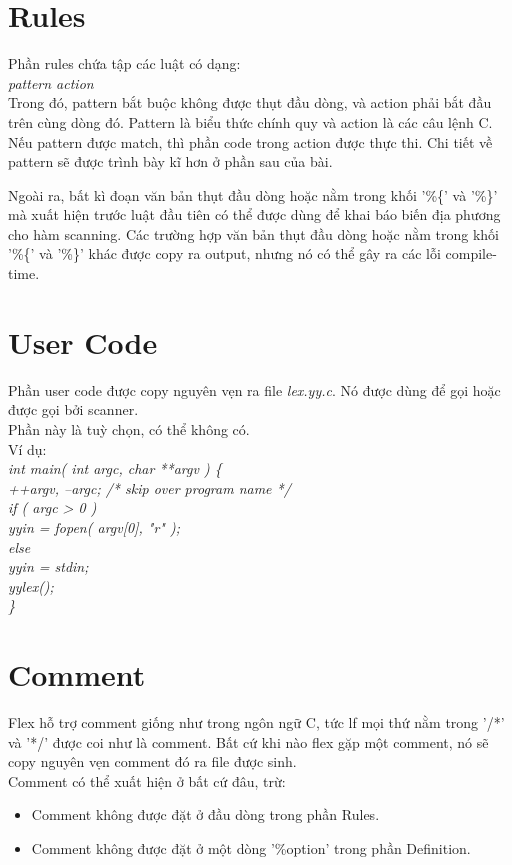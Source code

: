 \documentclass[14pt,a4paper]{extreport}
\begin{document}
\section{Rules}
Phần rules chứa tập các luật có dạng: \\
\hspace*{2cm}  \textit{pattern  action}\\
Trong đó, pattern bắt buộc không được thụt đầu dòng, và action phải bắt đầu trên cùng dòng đó. Pattern là biểu thức chính quy và action là các câu lệnh C. Nếu pattern được match, thì phần code trong action được thực thi. Chi tiết về pattern sẽ được trình bày kĩ hơn ở phần sau của bài.

Ngoài ra, bất kì đoạn văn bản thụt đầu dòng hoặc nằm trong khối '\%\{' và '\%\}' mà xuất hiện trước luật đầu tiên có thể được dùng để khai báo biến địa phương cho hàm scanning. Các trường hợp văn bản thụt đầu dòng hoặc nằm trong khối '\%\{' và '\%\}' khác được copy ra output, nhưng nó có thể gây ra các lỗi compile-time.

\section{User Code}
Phần user code được copy nguyên vẹn ra file \textit{lex.yy.c}. Nó được dùng để gọi hoặc được gọi bởi scanner. \\
Phần này là tuỳ chọn, có thể không có.\\
Ví dụ:\\
\textit{    int main( int argc, char **argv )
\{\\
\hspace*{2cm}	++argv, --argc;  /* skip over program name */ \\
\hspace*{2cm}	if ( argc > 0 )\\
\hspace*{3cm}	yyin = fopen( argv[0], "r" );\\
\hspace*{2cm}	else\\
\hspace*{3cm}	yyin = stdin;\\
\hspace*{2cm}	yylex();\\
\}\\}




\section{Comment}
Flex hỗ trợ comment giống như trong ngôn ngữ C, tức lf mọi thứ nằm trong '/*' và '*/' được coi như là comment. Bất cứ khi nào flex gặp một comment, nó sẽ copy nguyên vẹn comment đó ra file được sinh. \\
Comment có thể xuất hiện ở bất cứ đâu, trừ:
\begin{itemize}
	\item Comment không được đặt ở đầu dòng trong phần Rules.
	\item Comment không được đặt ở một dòng '\%option' trong phần Definition.
\end{itemize}
\end{document}
